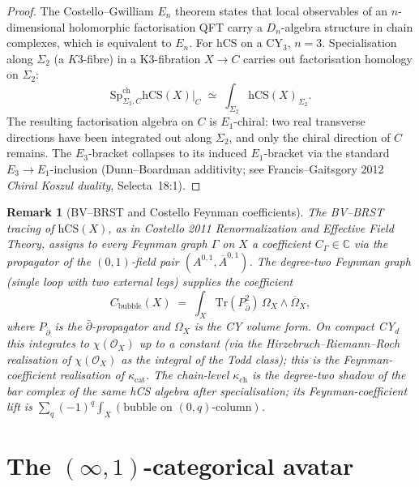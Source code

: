 \documentclass[11pt]{article}
\newtheorem{remark}[theorem]{Remark}
\newcommand{\C}{\mathbb{C}}
\newcommand{\cO}{\mathcal{O}}
\newcommand{\hCS}{\mathrm{hCS}}
\begin{document}
\begin{proof}
The Costello--Gwilliam $E_n$ theorem states that local observables of
an $n$-dimensional holomorphic factorisation QFT carry a $D_n$-algebra
structure in chain complexes, which is equivalent to $E_n$. For $\hCS$
on a CY$_3$, $n=3$. Specialisation along $\Sigma_2$ (a $K3$-fibre) in a
K3-fibration $X\to C$ carries out factorisation homology on $\Sigma_2$:
\[
  \mathrm{Sp}^{\mathrm{ch}}_{\Sigma_2,C}\hCS(X)\bigr|_C
  \;\simeq\;
  \int_{\Sigma_2}\hCS(X)_{\Sigma_2}.
\]
The resulting factorisation algebra on $C$ is $E_1$-chiral: two real
transverse directions have been integrated out along $\Sigma_2$, and
only the chiral direction of $C$ remains. The $E_3$-bracket collapses
to its induced $E_1$-bracket via the standard
$E_3\to E_1$-inclusion (Dunn--Boardman additivity;
see Francis--Gaitsgory 2012 \emph{Chiral Koszul duality},
Selecta~18:1).
\end{proof}

\begin{remark}[BV--BRST and Costello Feynman coefficients]
\label{rem:BV-costello-feynman}
The BV--BRST tracing of $\hCS(X)$, as in Costello 2011
\emph{Renormalization and Effective Field Theory}, assigns to every
Feynman graph $\Gamma$ on $X$ a coefficient $C_\Gamma\in\C$ via the
propagator of the $(0,1)$-field pair $(A^{0,1},\overline{A}^{0,1})$. The
degree-two Feynman graph (single loop with two external legs) supplies
the coefficient
\[
  C_{\text{bubble}}(X)
  \;=\;
  \int_X \mathrm{Tr}(P_{\bar\partial}^2)\,\Omega_X\wedge\overline{\Omega}_X,
\]
where $P_{\bar\partial}$ is the $\bar\partial$-propagator and $\Omega_X$
is the CY volume form. On compact CY$_d$ this integrates to
$\chi(\cO_X)$ up to a constant (via the
Hirzebruch--Riemann--Roch realisation of $\chi(\cO_X)$ as the
integral of the Todd class); this is the Feynman-coefficient realisation of
$\kappa_{\mathrm{cat}}$. The chain-level $\kappa_{\mathrm{ch}}$ is the
degree-two shadow of the bar complex of the \emph{same} hCS algebra
after specialisation; its Feynman-coefficient lift is
$\sum_q(-1)^q\int_X(\text{bubble on }(0,q)\text{-column})$.
\end{remark}

\section{The $(\infty,1)$-categorical avatar}
\label{sec:infty-1-cat-avatar}
\end{document}
